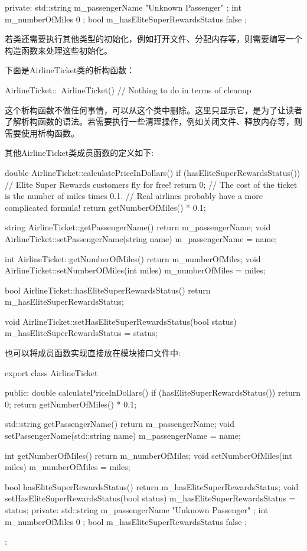 \begin{cpp}
private:
    std::string m_passengerName { "Unknown Passenger" };
    int m_numberOfMiles { 0 };
    bool m_hasEliteSuperRewardsStatus { false };
\end{cpp}

若类还需要执行其他类型的初始化，例如打开文件、分配内存等，则需要编写一个构造函数来处理这些初始化。

下面是AirlineTicket类的析构函数：

\begin{cpp}
AirlineTicket::~AirlineTicket()
{
    // Nothing to do in terms of cleanup
}
\end{cpp}

这个析构函数不做任何事情，可以从这个类中删除。这里只显示它，是为了让读者了解析构函数的语法。若需要执行一些清理操作，例如关闭文件、释放内存等，则需要使用析构函数。

其他AirlineTicket类成员函数的定义如下:

\begin{cpp}
double AirlineTicket::calculatePriceInDollars()
{
    if (hasEliteSuperRewardsStatus()) {
        // Elite Super Rewards customers fly for free!
        return 0;
    }
    // The cost of the ticket is the number of miles times 0.1.
    // Real airlines probably have a more complicated formula!
    return getNumberOfMiles() * 0.1;
}

string AirlineTicket::getPassengerName() { return m_passengerName; }
void AirlineTicket::setPassengerName(string name) { m_passengerName = name; }

int AirlineTicket::getNumberOfMiles() { return m_numberOfMiles; }
void AirlineTicket::setNumberOfMiles(int miles) { m_numberOfMiles = miles; }

bool AirlineTicket::hasEliteSuperRewardsStatus()
{
    return m_hasEliteSuperRewardsStatus;
}

void AirlineTicket::setHasEliteSuperRewardsStatus(bool status)
{
    m_hasEliteSuperRewardsStatus = status;
}
\end{cpp}

也可以将成员函数实现直接放在模块接口文件中:

\begin{cpp}
export class AirlineTicket
{
    public:
        double calculatePriceInDollars()
        {
            if (hasEliteSuperRewardsStatus()) { return 0; }
            return getNumberOfMiles() * 0.1;
        }

        std::string getPassengerName() { return m_passengerName; }
        void setPassengerName(std::string name) { m_passengerName = name; }

        int getNumberOfMiles() { return m_numberOfMiles; }
        void setNumberOfMiles(int miles) { m_numberOfMiles = miles; }

        bool hasEliteSuperRewardsStatus() { return m_hasEliteSuperRewardsStatus; }
        void setHasEliteSuperRewardsStatus(bool status)
        {
            m_hasEliteSuperRewardsStatus = status;
        }
    private:
        std::string m_passengerName { "Unknown Passenger" };
        int m_numberOfMiles { 0 };
        bool m_hasEliteSuperRewardsStatus { false };
};
\end{cpp}

